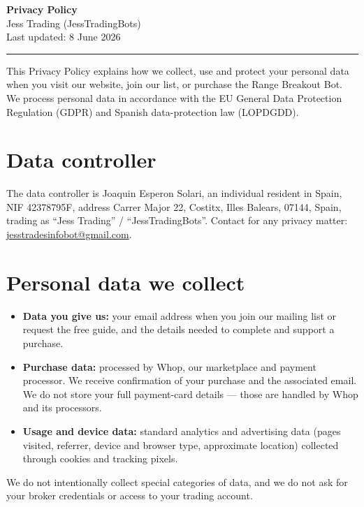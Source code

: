 \documentclass[11pt,a4paper]{article}
\begin{document}
\thispagestyle{fancy}

{\Huge\bfseries Privacy Policy}\\[0.4em]
{\large Jess Trading (JessTradingBots)}\\[0.3em]
{\small Last updated: 8 June 2026}

\vspace{0.6em}
\hrule
\vspace{1em}

This Privacy Policy explains how we collect, use and protect your personal data when you visit our
website, join our list, or purchase the Range Breakout Bot. We process personal data in accordance
with the EU General Data Protection Regulation (GDPR) and Spanish data-protection law (LOPDGDD).

\section{Data controller}
The data controller is Joaquin Esperon Solari, an individual resident in Spain, NIF 42378795F,
address Carrer Major 22, Costitx, Illes Balears, 07144, Spain, trading as ``Jess Trading'' /
``JessTradingBots''. Contact for any privacy matter:
\href{mailto:jesstradesinfobot@gmail.com}{jesstradesinfobot@gmail.com}.

\section{Personal data we collect}
\begin{itemize}
  \item \textbf{Data you give us:} your email address when you join our mailing list or request the
  free guide, and the details needed to complete and support a purchase.
  \item \textbf{Purchase data:} processed by Whop, our marketplace and payment processor. We receive
  confirmation of your purchase and the associated email. We do not store your full payment-card
  details --- those are handled by Whop and its processors.
  \item \textbf{Usage and device data:} standard analytics and advertising data (pages visited,
  referrer, device and browser type, approximate location) collected through cookies and tracking
  pixels.
\end{itemize}
We do not intentionally collect special categories of data, and we do not ask for your broker
credentials or access to your trading account.
\end{document}
